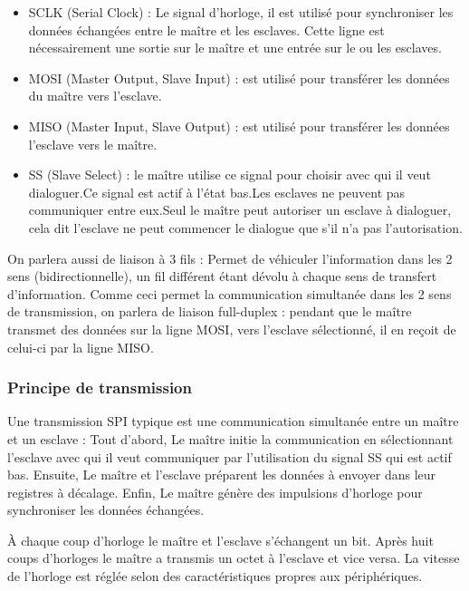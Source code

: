 \documentclass[french,a4paper,12pt]{report}
\begin{document}
\begin{itemize}
\item SCLK (Serial Clock) : Le signal d'horloge, il est utilisé pour synchroniser les données échangées entre le maître et les esclaves. Cette ligne est nécessairement une sortie sur le maître et une entrée sur le ou les esclaves.

\item MOSI (Master Output, Slave Input) : est utilisé pour transférer les données du maître vers l'esclave.

\item MISO (Master Input, Slave Output) : est utilisé pour transférer les données l'esclave vers le maître.

\item SS (Slave Select) : le maître utilise ce signal pour choisir avec qui il veut dialoguer.Ce signal est actif à l'état bas.Les esclaves ne peuvent pas communiquer entre eux.Seul le maître peut autoriser un esclave à dialoguer, cela dit l'esclave ne peut commencer le dialogue que s'il n'a pas l'autorisation.
\end{itemize}

On parlera aussi de liaison à 3 fils : Permet de véhiculer l’information dans les 2 sens (bidirectionnelle), un fil différent étant dévolu à chaque sens de transfert d’information. Comme ceci permet la communication simultanée dans les 2 sens de transmission, on parlera de liaison full-duplex :
pendant que le maître transmet des données sur la ligne MOSI, vers l’esclave sélectionné, il en reçoit de celui-ci par la ligne MISO.

  \subsubsection{Principe de transmission}
Une transmission SPI typique est une communication simultanée entre un maître et un esclave :
Tout d'abord, Le maître initie la communication en sélectionnant l'esclave avec qui il veut communiquer par l'utilisation du signal SS qui est actif bas.
Ensuite, Le maître et l'esclave préparent les données à envoyer dans leur registres à décalage.
Enfin, Le maître génère des impulsions d'horloge pour synchroniser les données échangées.

À chaque coup d'horloge le maître et l'esclave s'échangent un bit. Après huit coups d'horloges le maître a transmis un octet à l'esclave et vice versa. La vitesse de l'horloge est réglée selon des caractéristiques propres aux périphériques.
\end{document}
